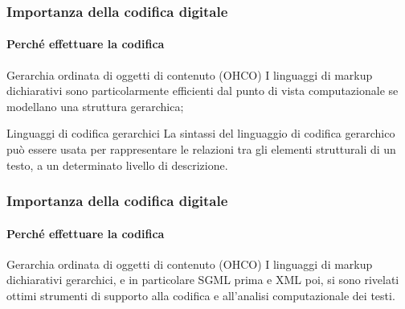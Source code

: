 \begin{frame}
	\frametitle{Importanza della codifica digitale}
	\framesubtitle{Perché effettuare la codifica}
	\addtocounter{nframe}{1}

	\begin{block}{Gerarchia ordinata di oggetti di contenuto (OHCO)}
		I linguaggi di markup dichiarativi sono particolarmente efficienti dal punto di vista computazionale se modellano una struttura gerarchica; 
	\end{block}

	\begin{block}{Linguaggi di codifica gerarchici}
		La sintassi del linguaggio di codifica gerarchico può essere usata per rappresentare le relazioni tra gli elementi strutturali di un testo, a un determinato livello di descrizione.
	\end{block}

\end{frame}

\begin{frame}
	\frametitle{Importanza della codifica digitale}
	\framesubtitle{Perché effettuare la codifica}
	\addtocounter{nframe}{1}

	\begin{block}{Gerarchia ordinata di oggetti di contenuto (OHCO)}
	 I linguaggi di markup dichiarativi gerarchici, e in particolare SGML prima e XML poi, si sono rivelati ottimi strumenti di supporto alla codifica e all’analisi computazionale dei testi.
	\end{block}

\end{frame}





